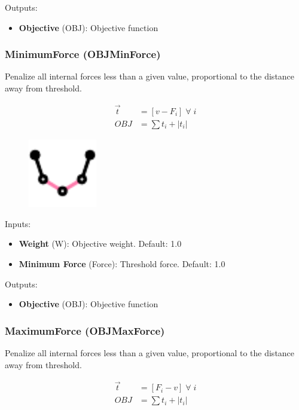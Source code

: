Outputs:
\begin{itemize}
    \setlength\itemsep{0.05em}
    \item \textbf{Objective} (OBJ): Objective function
\end{itemize}

\subsubsection{MinimumForce (OBJMinForce)} \label{OBJMinForce}
Penalize all internal forces less than a given value, proportional to the distance away from threshold.

\begin{align*}
    \vec{t} &= \left[v - F_i\right] \; \forall \; i\\
    OBJ &= \sum t_i + |t_i|
\end{align*}

\begin{figure}[h]
    \centering
    \includegraphics*[width = 3cm]{Figures/minforce}
\end{figure}

Inputs:
\begin{itemize}
    \setlength\itemsep{0.05em}
    \item \textbf{Weight} (W): Objective weight. {\color{gray} Default: 1.0}
    \item \textbf{Minimum Force} (Force): Threshold force. {\color{gray} Default: 1.0}
\end{itemize}

Outputs:
\begin{itemize}
    \setlength\itemsep{0.05em}
    \item \textbf{Objective} (OBJ): Objective function
\end{itemize}

\subsubsection{MaximumForce (OBJMaxForce)} \label{OBJMaxForce}
Penalize all internal forces less than a given value, proportional to the distance away from threshold.

\begin{align*}
    \vec{t} &= \left[F_i - v\right] \; \forall \; i\\
    OBJ &= \sum t_i + |t_i|
\end{align*}

